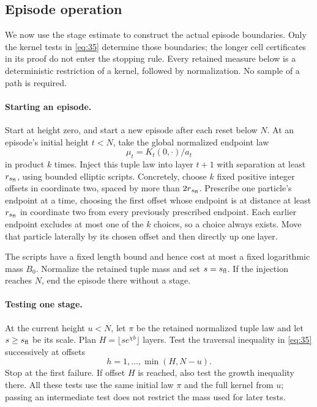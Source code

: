 \subsection{Episode operation}

We now use the stage estimate to construct the actual episode boundaries.
Only the kernel tests in \eqref{eq:35} determine those boundaries; the
longer cell certificates in its proof do not enter the stopping rule.
Every retained measure below is a deterministic restriction of a kernel,
followed by normalization. No sample of a path is required.

\paragraph{Starting an episode.}
Start at height zero, and start a new episode after each reset below
\(N\). At an episode's initial height \(t<N\), take the global
normalized endpoint law
\[
 \mu_t=K_t(0,\cdot)/a_t
\]
in product \(k\) times. Inject this tuple law into layer \(t+1\)
with separation at least \(r_{s_{\rm fl}}\), using bounded elliptic
scripts. Concretely, choose \(k\) fixed positive integer offsets in
coordinate two, spaced by more than \(2r_{s_{\rm fl}}\). Prescribe
one particle's endpoint at a time, choosing the first offset whose
endpoint is at distance at least \(r_{s_{\rm fl}}\) in coordinate
two from every previously prescribed endpoint. Each earlier endpoint
excludes at most one of the \(k\) choices, so a choice always exists.
Move that particle laterally by its chosen offset and then directly up
one layer.

The scripts have a fixed length bound and hence cost at most a fixed
logarithmic mass \(B_0\). Normalize the retained tuple mass and set
\(s=s_{\rm fl}\). If the injection reaches \(N\), end the episode
there without a stage.

\paragraph{Testing one stage.}
At the current height \(u<N\), let \(\pi\) be the retained
normalized tuple law and let \(s\ge s_{\rm fl}\) be its scale.
Plan \(H=\lfloor se^{\chi b}\rfloor\) layers. Test the traversal
inequality in \eqref{eq:35} successively at offsets
\[
 h=1,\ldots,\min(H,N-u).
\]
Stop at the first failure. If offset \(H\) is reached, also test the
growth inequality there. All these tests use the same initial law
\(\pi\) and the full kernel from \(u\); passing an intermediate
test does not restrict the mass used for later tests.

